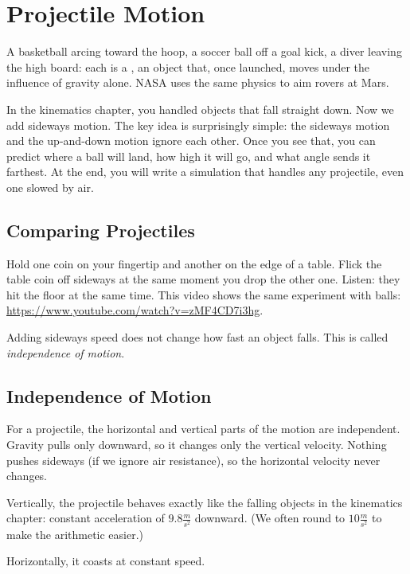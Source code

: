 \chapter{Projectile Motion}
A basketball arcing toward the hoop, a soccer ball off a goal kick, a diver
leaving the high board: each is a , an object that,
once launched, moves under the influence of gravity alone. NASA uses the
same physics to aim rovers at Mars.

In the kinematics chapter, you handled objects that fall straight down. Now
we add sideways motion. The key idea is surprisingly simple: the sideways
motion and the up-and-down motion ignore each other. Once you see that, you
can predict where a ball will land, how high it will go, and what angle
sends it farthest. At the end, you will write a simulation that handles any
projectile, even one slowed by air. 

\section{Comparing Projectiles}
Hold one coin on your fingertip and another on the edge of a table. Flick
the table coin off sideways at the same moment you drop the other one.
Listen: they hit the floor at the same time. This video shows the same
experiment with balls: \url{https://www.youtube.com/watch?v=zMF4CD7i3hg}.

Adding sideways speed does not change how fast an object falls. This is
called \emph{independence of motion}.


\section{Independence of Motion}
For a projectile, the horizontal and vertical parts of the motion are
independent. Gravity pulls only downward, so it changes only the vertical
velocity. Nothing pushes sideways (if we ignore air resistance), so the
horizontal velocity never changes.

Vertically, the projectile behaves exactly like the falling objects in the
kinematics chapter: constant acceleration of $9.8 \frac{m}{s^2}$ downward.
(We often round to $10 \frac{m}{s^2}$ to make the arithmetic easier.)

Horizontally, it coasts at constant speed.

